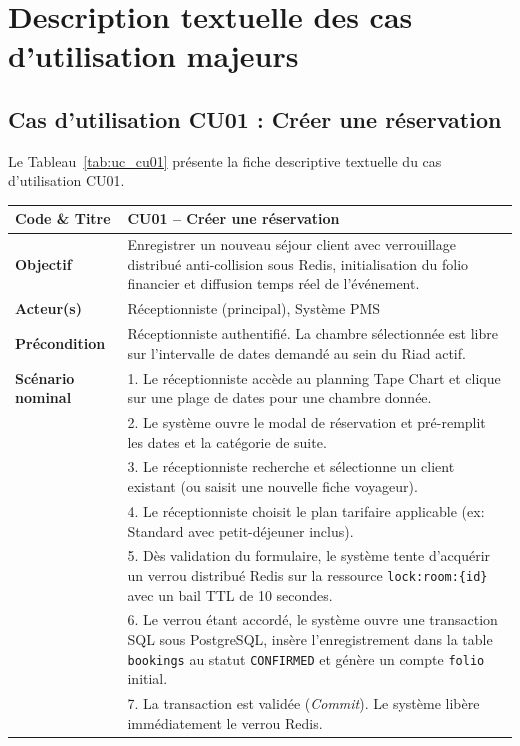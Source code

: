 \documentclass[12pt,a4paper,oneside]{report}
\begin{document}
\section{Description textuelle des cas d'utilisation majeurs}

\subsection{Cas d'utilisation CU01 : Créer une réservation}

Le Tableau~\ref{tab:uc_cu01} présente la fiche descriptive textuelle du cas d'utilisation CU01.

\begin{table}[H]
\centering
\small
\renewcommand{\arraystretch}{1.2}
\begin{tabularx}{\textwidth}{|p{3.5cm}|X|}
\hline
\textbf{Code \& Titre} & \textbf{CU01 -- Créer une réservation} \\
\hline
\textbf{Objectif} & Enregistrer un nouveau séjour client avec verrouillage distribué anti-collision sous Redis, initialisation du folio financier et diffusion temps réel de l'événement. \\
\hline
\textbf{Acteur(s)} & Réceptionniste (principal), Système PMS \\
\hline
\textbf{Précondition} & Réceptionniste authentifié. La chambre sélectionnée est libre sur l'intervalle de dates demandé au sein du Riad actif. \\
\hline
\textbf{Scénario nominal} & 
1. Le réceptionniste accède au planning Tape Chart et clique sur une plage de dates pour une chambre donnée.\\
& 2. Le système ouvre le modal de réservation et pré-remplit les dates et la catégorie de suite.\\
& 3. Le réceptionniste recherche et sélectionne un client existant (ou saisit une nouvelle fiche voyageur).\\
& 4. Le réceptionniste choisit le plan tarifaire applicable (ex: Standard avec petit-déjeuner inclus).\\
& 5. Dès validation du formulaire, le système tente d'acquérir un verrou distribué Redis sur la ressource \texttt{lock:room:\{id\}} avec un bail TTL de 10 secondes.\\
& 6. Le verrou étant accordé, le système ouvre une transaction SQL sous PostgreSQL, insère l'enregistrement dans la table \texttt{bookings} au statut \texttt{CONFIRMED} et génère un compte \texttt{folio} initial.\\
& 7. La transaction est validée (\textit{Commit}). Le système libère immédiatement le verrou Redis.\\

\end{tabularx}
\end{table}
\end{document}
